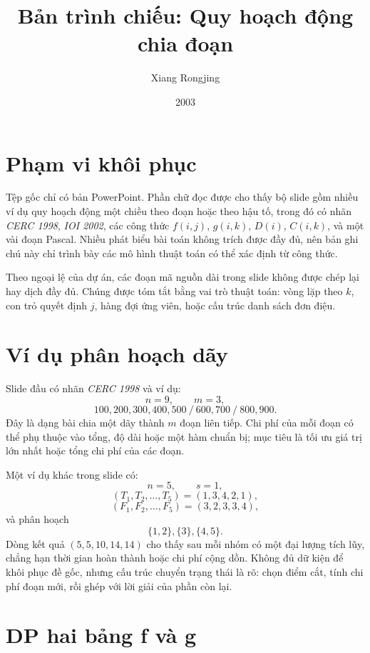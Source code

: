 \documentclass[11pt]{article}
\title{Bản trình chiếu: Quy hoạch động chia đoạn}
\author{Xiang Rongjing}
\date{2003}
\begin{document}
\maketitle


\section{Phạm vi khôi phục}

Tệp gốc chỉ có bản PowerPoint. Phần chữ đọc được cho thấy bộ slide gồm nhiều ví
dụ quy hoạch động một chiều theo đoạn hoặc theo hậu tố, trong đó có nhãn
\textit{CERC 1998}, \textit{IOI 2002}, các công thức \(f(i,j)\), \(g(i,k)\),
\(D(i)\), \(C(i,k)\), và một vài đoạn Pascal. Nhiều phát biểu bài toán không
trích được đầy đủ, nên bản ghi chú này chỉ trình bày các mô hình thuật toán
có thể xác định từ công thức.

Theo ngoại lệ của dự án, các đoạn mã nguồn dài trong slide không được chép lại
hay dịch đầy đủ. Chúng được tóm tắt bằng vai trò thuật toán: vòng lặp theo
\(k\), con trỏ quyết định \(j\), hàng đợi ứng viên, hoặc cấu trúc danh sách
đơn điệu.

\section{Ví dụ phân hoạch dãy}

Slide đầu có nhãn \textit{CERC 1998} và ví dụ:
\[
  n=9,\qquad m=3,
\]
\[
  100,200,300,400,500\ /\ 600,700\ /\ 800,900.
\]
Đây là dạng bài chia một dãy thành \(m\) đoạn liên tiếp. Chi phí của mỗi đoạn
có thể phụ thuộc vào tổng, độ dài hoặc một hàm chuẩn bị; mục tiêu là tối ưu
giá trị lớn nhất hoặc tổng chi phí của các đoạn.

Một ví dụ khác trong slide có:
\[
  n=5,\qquad s=1,
\]
\[
  (T_1,T_2,\ldots,T_5)=(1,3,4,2,1),
\]
\[
  (F_1,F_2,\ldots,F_5)=(3,2,3,3,4),
\]
và phân hoạch
\[
  \{1,2\},\{3\},\{4,5\}.
\]
Dòng kết quả \((5,5,10,14,14)\) cho thấy sau mỗi nhóm có một đại lượng tích
lũy, chẳng hạn thời gian hoàn thành hoặc chi phí cộng dồn. Không đủ dữ kiện
để khôi phục đề gốc, nhưng cấu trúc chuyển trạng thái là rõ: chọn điểm cắt,
tính chi phí đoạn mới, rồi ghép với lời giải của phần còn lại.

\section{DP hai bảng f và g}
\end{document}
